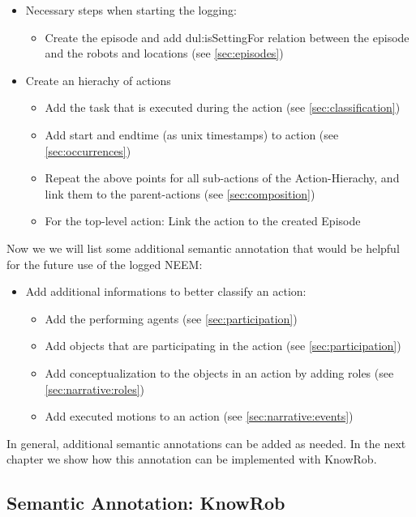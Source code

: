 \begin{itemize}
	\item Necessary steps when starting the logging:
	\begin{itemize}
		\item Create the episode and add dul:isSettingFor relation between the episode and the robots and locations (see \ref{sec:episodes})
	\end{itemize}
	\item Create an hierachy of actions
	\begin{itemize}
		\item Add the task that is executed during the action (see \ref{sec:classification})
		\item Add start and endtime (as unix timestamps) to action (see \ref{sec:occurrences})
		\item Repeat the above points for all sub-actions of the Action-Hierachy, and link them to the parent-actions (see \ref{sec:composition})
		\item For the top-level action: Link the action to the created Episode
	\end{itemize}
\end{itemize}

Now we we will list some additional semantic annotation that would be helpful for the future use of the logged NEEM:

\begin{itemize}
	\item Add additional informations to better classify an action: 
	\begin{itemize}
		\item Add the performing agents (see \ref{sec:participation})
		\item Add objects that are participating in the action (see \ref{sec:participation})
		\item Add conceptualization to the objects in an action by adding roles (see \ref{sec:narrative:roles})
		\item Add executed motions to an action (see \ref{sec:narrative:events})
	\end{itemize}
\end{itemize}

In general, additional semantic annotations can be added as needed. In the next chapter we show how this annotation can be implemented with KnowRob.

\subsection{Semantic Annotation: KnowRob}
\label{sec:semantic_annotation_knowrob}

